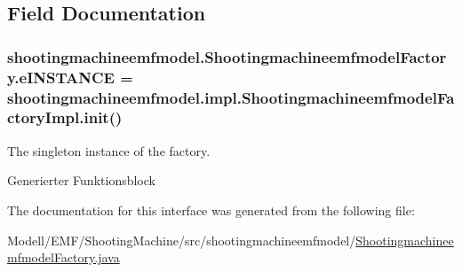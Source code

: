 \subsection{Field Documentation}
\hypertarget{interfaceshootingmachineemfmodel_1_1_shootingmachineemfmodel_factory_a000cd4598703f054fa910e19bf287f87}{
\subsubsection[{e\-I\-N\-S\-T\-A\-N\-C\-E}]{ shootingmachineemfmodel.\-Shootingmachineemfmodel\-Factory.\-e\-I\-N\-S\-T\-A\-N\-C\-E = {\bf shootingmachineemfmodel.\-impl.\-Shootingmachineemfmodel\-Factory\-Impl.\-init}()}}\label{interfaceshootingmachineemfmodel_1_1_shootingmachineemfmodel_factory_a000cd4598703f054fa910e19bf287f87}
The singleton instance of the factory.

Generierter Funktionsblock 

The documentation for this interface was generated from the following file\-:\begin{DoxyCompactItemize}
\item 
Modell/\-E\-M\-F/\-Shooting\-Machine/src/shootingmachineemfmodel/\hyperlink{_shootingmachineemfmodel_factory_8java}{Shootingmachineemfmodel\-Factory.\-java}\end{DoxyCompactItemize}
